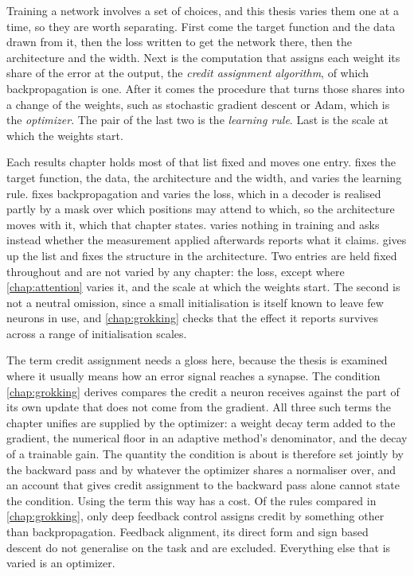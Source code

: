 Training a network involves a set of choices, and this thesis varies them one
at a time, so they are worth separating. First come the target function and
the data drawn from it, then the loss written to get the network there, then
the architecture and the width. Next is the computation that assigns each
weight its share of the error at the output, the \emph{credit assignment
algorithm}, of which backpropagation is one. After it comes the procedure that
turns those shares into a change of the weights, such as stochastic gradient
descent or Adam, which is the \emph{optimizer}. The pair of the last two is
the \emph{learning rule}. Last is the scale at which the weights start.

Each results chapter holds most of that list fixed and moves one entry.
 fixes the target function, the data, the architecture and
the width, and varies the learning rule.  fixes
backpropagation and varies the loss, which in a decoder is realised partly by
a mask over which positions may attend to which, so the architecture moves
with it, which that chapter states.  varies nothing in
training and asks instead whether the measurement applied afterwards reports
what it claims.  gives up the list and fixes the structure in
the architecture. Two entries are held fixed throughout and are not varied by
any chapter: the loss, except where \cref{chap:attention} varies it, and the
scale at which the weights start. The second is not a neutral omission, since
a small initialisation is itself known to leave few neurons in use, and
\cref{chap:grokking} checks that the effect it reports survives across a range
of initialisation scales.

The term credit assignment needs a gloss here, because the thesis is examined
where it usually means how an error signal reaches a synapse. The
condition \cref{chap:grokking} derives compares the credit a neuron receives
against the part of its own update that does not come from the gradient. All
three such terms the chapter unifies are supplied by the optimizer: a weight
decay term added to the gradient, the numerical floor in an adaptive method's
denominator, and the decay of a trainable gain. The quantity the condition is
about is therefore set jointly by the backward pass and by whatever the
optimizer shares a normaliser over, and an account that gives credit
assignment to the backward pass alone cannot state the condition. Using the
term this way has a cost. Of the rules compared in
\cref{chap:grokking}, only deep feedback control assigns credit by something
other than backpropagation. Feedback alignment, its
direct form and sign based descent do not generalise on the task and are
excluded. Everything else that is varied is an optimizer.

